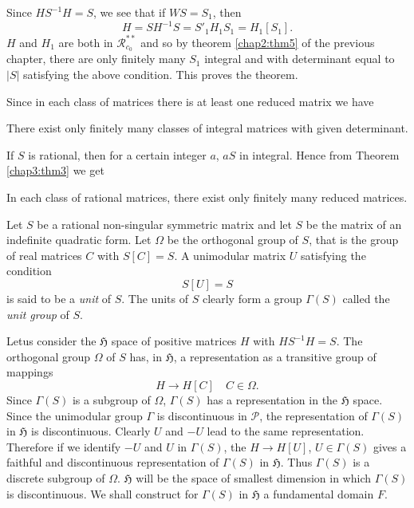 Since $HS^{-1}H=S$, we see that if $WS=S_{1}$, then
$$
H=SH^{-1}S={S'}_{1}H_{1}S_{1}=H_{1}[S_{1}].
$$
$H$ and $H_{1}$ are both in $\mathscr{R}^{\ast\ast}_{c_{0}}$ and so by
theorem \ref{chap2:thm5} of the previous chapter, there are only finitely
many $S_{1}$ integral and with determinant equal to $|S|$ satisfying
the above condition. This proves the theorem.

Since in each class of matrices there is at least one reduced matrix
we have

\setcounter{cor}{0}
\begin{cor}\label{chap3:coro1}
There exist only finitely many classes of integral matrices with given
determinant. 
\end{cor}

If $S$ is rational, then for a certain integer $a$, $aS$ in
integral. Hence from Theorem \ref{chap3:thm3} we get 

\begin{cor}\label{chap3:coro2}
In each class of rational matrices, there exist only finitely many
reduced matrices.
\end{cor}

Let $S$ be a rational non-singular symmetric matrix and let $S$ be the
matrix of an indefinite quadratic form. Let $\Omega$ be the orthogonal
group of $S$, that is the group of real matrices $C$ with $S[C]=S$. A
unimodular matrix $U$ satisfying the condition 
$$
S[U]=S
$$
is said to be a {\em unit} of $S$. The units of $S$ clearly form a
group $\Gamma(S)$ called the {\em unit group} of $S$.

Let\pageoriginale us consider the $\mathfrak{H}$ space of positive
matrices $H$ with $HS^{-1}H=S$. The orthogonal group $\Omega$ of $S$
has, in $\mathfrak{H}$, a representation as a transitive group of
mappings
$$
H\to H[C]\quad C\in \Omega.
$$
Since $\Gamma(S)$ is a subgroup of $\Omega$, $\Gamma(S)$ has a
representation in the $\mathfrak{H}$ space. Since the unimodular group
$\Gamma$ is discontinuous in $\mathscr{P}$, the representation of
$\Gamma(S)$ in $\mathfrak{H}$ is discontinuous. Clearly $U$ and $-U$
lead to the same representation. Therefore if we identify $-U$ and $U$
in $\Gamma(S)$, the $H\to H[U]$, $U\in\Gamma(S)$ gives a faithful and
discontinuous representation of $\Gamma(S)$ in $\mathfrak{H}$. Thus
$\Gamma(S)$ is a discrete subgroup of $\Omega$. $\mathfrak{H}$ will be
the space of smallest dimension in which $\Gamma(S)$ is
discontinuous. We shall construct for $\Gamma(S)$ in $\mathfrak{H}$ a
fundamental domain $F$.

